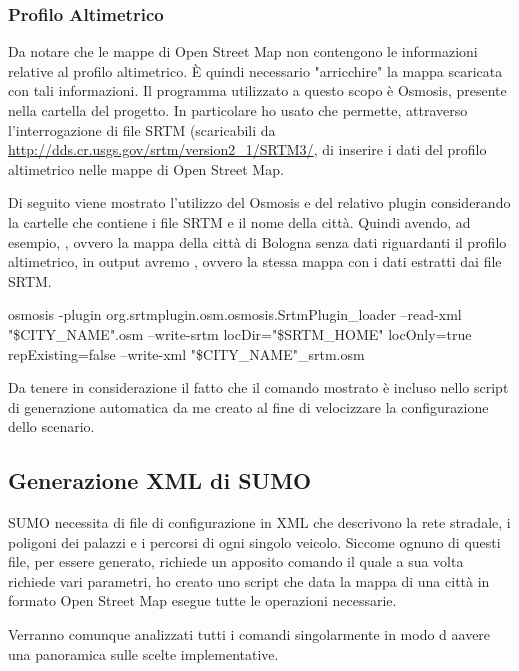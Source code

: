 \subsubsection{Profilo Altimetrico}\label{profilo-altimetrico}

Da notare che le mappe di Open Street Map non contengono le informazioni relative al profilo altimetrico. È quindi necessario "arricchire" la mappa scaricata con tali informazioni. Il programma utilizzato a questo scopo è Osmosis, presente nella cartella  del progetto. In particolare ho usato  che permette, attraverso l'interrogazione di file SRTM (scaricabili da \url{http://dds.cr.usgs.gov/srtm/version2_1/SRTM3/}, di inserire i dati del profilo altimetrico nelle mappe di Open Street Map. 

Di seguito viene mostrato l'utilizzo del Osmosis e del relativo plugin considerando  la cartelle che contiene i file SRTM e  il nome della città. Quindi avendo, ad esempio, , ovvero la mappa della città di Bologna senza dati riguardanti il profilo altimetrico, in output avremo , ovvero la stessa mappa con i dati estratti dai file SRTM.

\begin{bash}
osmosis -plugin org.srtmplugin.osm.osmosis.SrtmPlugin_loader --read-xml "\$CITY_NAME".osm --write-srtm locDir="\$SRTM_HOME" locOnly=true repExisting=false --write-xml "\$CITY_NAME"_srtm.osm
\end{bash}

%

Da tenere in considerazione il fatto che il comando mostrato è incluso nello script di generazione automatica da me creato al fine di velocizzare la configurazione dello scenario.

\subsection{Generazione XML di SUMO}

SUMO necessita di file di configurazione in XML che descrivono la rete stradale, i poligoni dei palazzi e i percorsi di ogni singolo veicolo. Siccome ognuno di questi file, per essere generato, richiede un apposito comando il quale a sua volta richiede vari parametri, ho creato uno script che data la mappa di una città in formato Open Street Map esegue tutte le operazioni necessarie.

Verranno comunque analizzati tutti i comandi singolarmente in modo d aavere una panoramica sulle scelte implementative.

